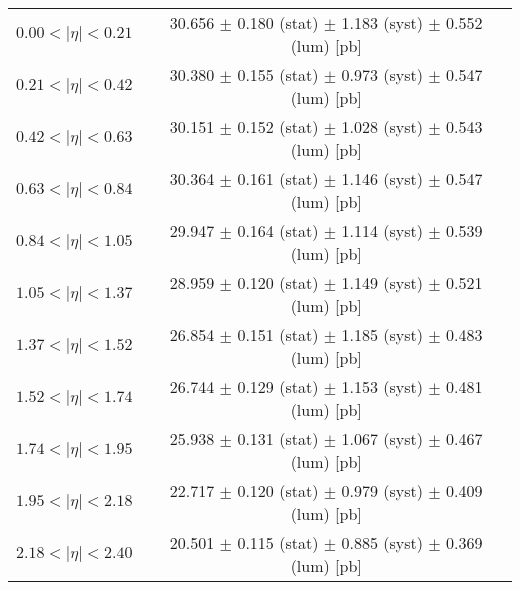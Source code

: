 \begin{tabular}{lc}
\hline
$0.00 < |\eta| <0.21$          & 30.656 $\pm$ 0.180 (stat) $\pm$ 1.183 (syst) $\pm$ 0.552 (lum) [pb]  \\
$0.21 < |\eta| <0.42$          & 30.380 $\pm$ 0.155 (stat) $\pm$ 0.973 (syst) $\pm$ 0.547 (lum) [pb]  \\
$0.42 < |\eta| <0.63$          & 30.151 $\pm$ 0.152 (stat) $\pm$ 1.028 (syst) $\pm$ 0.543 (lum) [pb]  \\
$0.63 < |\eta| <0.84$          & 30.364 $\pm$ 0.161 (stat) $\pm$ 1.146 (syst) $\pm$ 0.547 (lum) [pb]  \\
$0.84 < |\eta| <1.05$          & 29.947 $\pm$ 0.164 (stat) $\pm$ 1.114 (syst) $\pm$ 0.539 (lum) [pb]  \\
$1.05 < |\eta| <1.37$          & 28.959 $\pm$ 0.120 (stat) $\pm$ 1.149 (syst) $\pm$ 0.521 (lum) [pb]  \\
$1.37 < |\eta| <1.52$          & 26.854 $\pm$ 0.151 (stat) $\pm$ 1.185 (syst) $\pm$ 0.483 (lum) [pb]  \\
$1.52 < |\eta| <1.74$          & 26.744 $\pm$ 0.129 (stat) $\pm$ 1.153 (syst) $\pm$ 0.481 (lum) [pb]  \\
$1.74 < |\eta| <1.95$          & 25.938 $\pm$ 0.131 (stat) $\pm$ 1.067 (syst) $\pm$ 0.467 (lum) [pb]  \\
$1.95 < |\eta| <2.18$          & 22.717 $\pm$ 0.120 (stat) $\pm$ 0.979 (syst) $\pm$ 0.409 (lum) [pb]  \\
$2.18 < |\eta| <2.40$          & 20.501 $\pm$ 0.115 (stat) $\pm$ 0.885 (syst) $\pm$ 0.369 (lum) [pb]  \\
\hline
\end{tabular}
